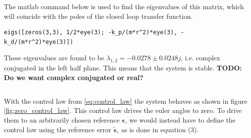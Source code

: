 The matlab command below is used to find the eigenvalues of this matrix, which will coincide with the poles of the closed loop transfer function.
\lstset{language=Matlab, basicstyle=\small}
\begin{lstlisting}[frame=single]
eigs([zeros(3,3), 1/2*eye(3); -k_p/(m*r^2)*eye(3), -k_d/(m*r^2)*eye(3)])
\end{lstlisting}
These eigenvalues are found to be $\lambda_{1,2} = -0.0278 \pm 0.0248j$, i.e. complex conjugated in the left half plane. This means that the system is stable. \textbf{TODO: Do we want complex conjugated or real?}

\subsection{}
With the control law from \eqref{eq:control_law} the system behaves as shown in figure \ref{fig:zero_control_law}. This control law drives the euler angles to zero. To drive them to an arbitrarily chosen reference $\boldsymbol{\epsilon}$, we would instead have to define the control law using the reference error $\tilde{\boldsymbol{\epsilon}}$, as is done in equation (3).
